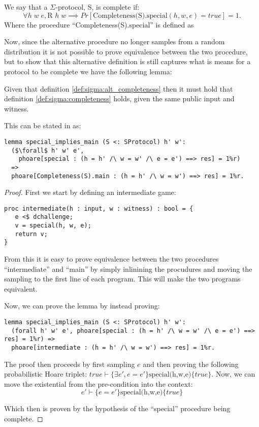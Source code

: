\begin{definition}
\label{def:sigma:alt_completeness}
  We say that a $\Sigma$-protocol, S, is complete if:
  \begin{equation}
    \label{eq:sigma_completeness}
    \forall h \; w \; e, \text{R } h \; w \implies Pr[\text{Completeness(S).special}(h,w,e) = true] = 1.
  \end{equation}
  Where the procedure ``Completeness(S).special'' is defined as
  
\end{definition}

Now, since the alternative procedure no longer samples from a random
distribution it is not possible to prove equivalence between the two procedure,
but to show that this alternative definition is still captures what is means for
a protocol to be complete we have the following lemma:

\begin{lemma}
Given that definition \ref{def:sigma:alt_completeness} then it must hold that
definition \ref{def:sigma:completeness} holds, given the same public input and witness.

This can be stated in \easycrypt as:
\begin{lstlisting}[mathescape]
lemma special_implies_main (S <: SProtocol) h' w':
  ($\forall$ h' w' e',
    phoare[special : (h = h' /\ w = w' /\ e = e') ==> res] = 1%r)
  =>
  phoare[Completeness(S).main : (h = h' /\ w = w') ==> res] = 1%r.
\end{lstlisting}
\end{lemma}

\begin{proof}
First we start by defining an intermediate game:
\begin{lstlisting}
proc intermediate(h : input, w : witness) : bool = {
   e <$ dchallenge;
   v = special(h, w, e);
   return v;
}
\end{lstlisting}

From this it is easy to prove equivalence between the two procedures
``intermediate'' and ``main'' by simply inlinining the procudures and moving
the sampling to the first line of each program. This will make the two programs
equivalent.

Now, we can prove the lemma by instead proving:
\begin{lstlisting}
lemma special_implies_main (S <: SProtocol) h' w':
  (forall h' w' e', phoare[special : (h = h' /\ w = w' /\ e = e') ==> res] = 1%r) =>
  phoare[intermediate : (h = h' /\ w = w') ==> res] = 1%r.
\end{lstlisting}

The proof then proceeds by first sampling $e$ and then proving the following
probabilistic Hoare triplet: $true \vdash \{\exists e', e = e'\}
\text{special(h,w,e)} \{true\}$. Now, we can move the existential
from the pre-condition into the context:
\[
  e' \vdash \{e = e'\} \text{special(h,w,e)} \{true\}
\]

Which then is proven by the hypothesis of the ``special'' procedure being complete.

\end{proof}


